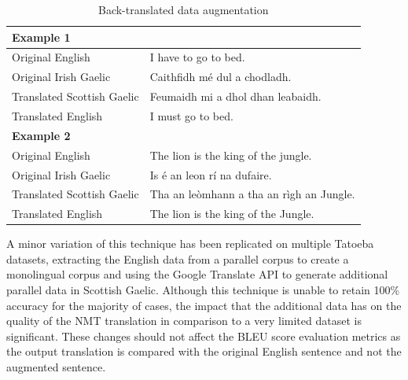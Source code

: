 \begin{table}[!ht]
\centering
\renewcommand{\arraystretch}{1.1}
\begin{tabular}{|l|l|}
\hline
\multicolumn{2}{|l|}{\textbf{Example 1}}                              \\ \hline
Original English           & I have to go to bed.                     \\ \hline
Original Irish Gaelic      & Caithfidh mé dul a chodladh.             \\ \hline
Translated Scottish Gaelic & Feumaidh mi a dhol dhan leabaidh.        \\ \hline
Translated English         & I must go to bed.                        \\ \hline
\multicolumn{2}{|l|}{\textbf{Example 2}}                              \\ \hline
Original English           & The lion is the king of the jungle.      \\ \hline
Original Irish Gaelic      & Is é an leon rí na dufaire.              \\ \hline
Translated Scottish Gaelic & Tha an leòmhann a tha an rìgh an Jungle. \\ \hline
Translated English         & The lion is the king of the Jungle.      \\ \hline
\end{tabular}
\captionsetup{justification=centering}
\caption{Back-translated data augmentation}
\label{tab:back_translated-data}
\end{table}

A minor variation of this technique has been replicated on multiple Tatoeba datasets, extracting the English data from a parallel corpus to create a monolingual corpus and using the Google Translate API to generate additional parallel data in Scottish Gaelic. Although this technique is unable to retain 100\% accuracy for the majority of cases, the impact that the additional data has on the quality of the \acrshort{NMT} translation in comparison to a very limited dataset is significant. These changes should not affect the BLEU score evaluation metrics as the output translation is compared with the original English sentence and not the augmented sentence.


